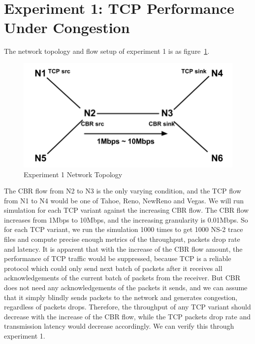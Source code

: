\documentclass[10pt, conference]{lib/IEEEtran}
\begin{document}
\section{Experiment 1: TCP Performance Under Congestion}
The network topology and flow setup of experiment 1 is as figure~\ref{fig:exp1_tpg}.
\begin{figure}[!htb]
    \centering
    \includegraphics[width=0.8\linewidth]{images/exp1-tpg.png}
    \caption{Experiment 1 Network Topology}
    \label{fig:exp1_tpg}
\end{figure}
The CBR flow from N2 to N3 is the only varying condition, and the TCP flow from N1 to N4 would be 
one of Tahoe, Reno, NewReno and Vegas. We will run simulation for each TCP variant against the 
increasing CBR flow. The CBR flow increases from 1Mbps to 10Mbps, and the increasing granularity 
is 0.01Mbps. So for each TCP variant, we run the simulation 1000 times to get 1000 NS-2 trace files 
and compute precise enough metrics of the throughput, packets drop rate and latency.
It is apparent that with the increase of the CBR flow amount, the performance of TCP traffic would be 
suppressed, because TCP is a reliable protocol which could only send next batch of packets after it 
receives all acknowledgements of the current batch of packets from the receiver. But CBR does not need 
any acknowledgements of the packets it sends, and we can assume that it simply blindly sends packets to 
the network and generates congestion, regardless of packets drops. Therefore, the throughput of any TCP 
variant should decrease with the increase of the CBR flow, while the TCP packets drop rate and transmission 
latency would decrease accordingly. We can verify this through experiment 1.
\end{document}

